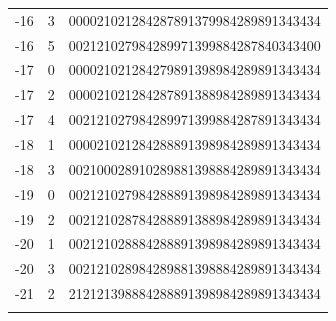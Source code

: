 \documentclass{article}
\begin{document}
\begin{supertabular}[h]{c c r}
-16   & 3  & 000021021284287891379984289891343434  \\
-16   & 5  & 002121027984289971399884287840343400  \\
-17   & 0  & 000021021284279891398984289891343434  \\
-17   & 2  & 000021021284287891388984289891343434  \\
-17   & 4  & 002121027984289971399884287891343434  \\
-18   & 1  & 000021021284288891398984289891343434  \\
-18   & 3  & 002100028910289881398884289891343434  \\
-19   & 0  & 002121027984288891398984289891343434  \\
-19   & 2  & 002121028784288891388984289891343434  \\
-20   & 1  & 002121028884288891398984289891343434  \\
-20   & 3  & 002121028984289881398884289891343434  \\
-21   & 2  & 212121398884288891398984289891343434  \\
\\[-5pt]


\end{supertabular}
\end{document}

